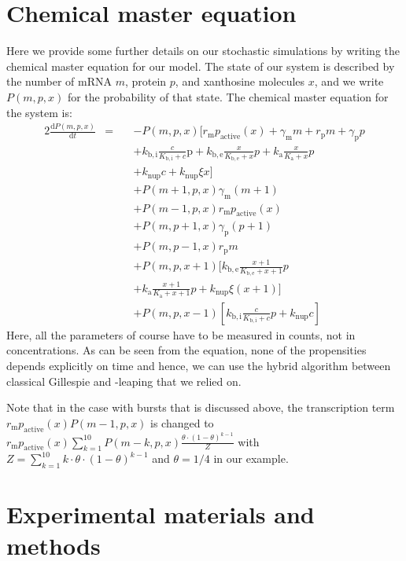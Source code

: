 \documentclass[10pt,letterpaper]{article}
\newcommand{\n}[1]{\mathrm{#1}}
\newcommand{\dd}[2]{\frac{\mathrm{d} #1}{\mathrm{d} #2}}
\begin{document}
\section{Chemical master equation}
Here we provide some further details on our stochastic simulations by writing the chemical master equation for our model. The state of our system is described by the number of mRNA $m$, protein $p$, and xanthosine molecules $x$, and we write $P(m,p,x)$ for the probability of that state. The chemical master equation for the system is:
\begin{alignat}{2}
\dd{P(m,p,x)}{t} &= \ && - P(m,p,x) [ r_{\n{m}} p_{\n{active}}(x) + \gamma_{\n{m}} m + r_{\n{p}} m + \gamma_{\n{p}} p \nonumber \\ & && + k_{\n{b,i}} \frac{c}{K_{\n{b,i}} + c} \n{p} + k_{\n{b,e}} \frac{x}{K_{\n{b,e}} + x} p + k_{\n{a}} \frac{x}{K_{\n{a}} + x} p \nonumber \\ & && + k_{\n{nup}} c + k_{\n{nup}} \xi x ] \nonumber \\ & && 
+ P(m+1,p,x) \gamma_{\n{m}} (m + 1) \nonumber \\ & &&  + P(m-1,p,x) r_{\n{m}} p_{\n{active}}(x) \nonumber \\ & && 
+ P(m,p+1,x) \gamma_{\n{p}} (p + 1) \nonumber \\ & &&  + P(m,p-1,x) r_{\n{p}} m \nonumber \\ & && 
+ P(m,p,x+1) [ k_{\n{b,e}} \frac{x+1}{K_{\n{b,e}} + x+1} p \nonumber \\ & && + k_{\n{a}} \frac{x+1}{K_{\n{a}} + x+1} p + k_{\n{nup}} \xi (x+1) ] \nonumber \\ & &&
+ P(m,p,x-1) [ k_{\n{b,i}} \frac{c}{K_{\n{b,i}} + c} p + k_{\n{nup}} c ]  
\end{alignat}
Here, all the parameters of course have to be measured in counts, not in concentrations. As can be seen from the equation, none of the propensities depends explicitly on time and hence, we can use the hybrid algorithm between classical Gillespie and \texttau-leaping that we relied on.


Note that in the case with bursts that is discussed above, the transcription term $r_{\n{m}} p_{\n{active}}(x) P(m-1,p,x)$ is changed to $r_{\n{m}} p_{\n{active}}(x) \sum_{k=1}^{10} P(m-k,p,x) \frac{\theta\cdot (1-\theta)^{k-1}}{Z}$ with $Z = \sum_{k=1}^{10} k \cdot \theta\cdot (1-\theta)^{k-1}$ and $\theta = 1/4$ in our example.

\FloatBarrier
\newpage

\section{Experimental materials and methods} \label{sec:exp}
\end{document}
